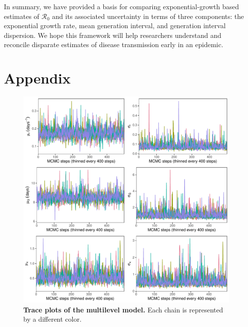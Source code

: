 \documentclass[12pt]{article}
\newcommand{\Ro}{\ensuremath{{\mathcal R}_{0}}\xspace}
\begin{document}
In summary, we have provided a basis for comparing exponential-growth based estimates of \Ro and its associated uncertainty in terms of three components: the exponential growth rate, mean generation interval, and generation interval dispersion. 
We hope this framework will help researchers understand and reconcile disparate estimates of disease transmission early in an epidemic.

\pagebreak



\pagebreak
\appendix
\renewcommand\thefigure{A\arabic{figure}}
\setcounter{figure}{0}    
\section*{Appendix}

\begin{figure}[!h]
\includegraphics[width=\textwidth]{posterior_chain.pdf}
\caption{
\textbf{Trace plots of the multilevel model.}
Each chain is represented by a different color.
}
\end{figure}

\pagebreak
\end{document}
